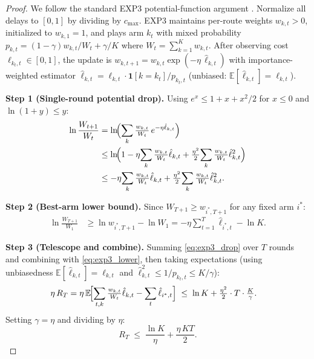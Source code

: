 \documentclass[11pt]{article}
\theoremstyle{definition}
\theoremstyle{remark}
\begin{document}
\begin{proof}
We follow the standard EXP3 potential-function argument
\cite{auer2002nonstochastic}.
Normalize all delays to $[0,1]$ by dividing by $c_{\max}$.
EXP3 maintains per-route weights $w_{k,t} > 0$, initialized to $w_{k,1}=1$,
and plays arm $k_t$ with mixed probability
$p_{k,t} = (1-\gamma)w_{k,t}/W_t + \gamma/K$
where $W_t = \sum_{k=1}^K w_{k,t}$.
After observing cost $\ell_{k_t,t} \in [0,1]$, the update is
$w_{k,t+1} = w_{k,t}\exp(-\eta\,\hat\ell_{k,t})$ with
importance-weighted estimator
$\hat\ell_{k,t} = \ell_{k,t}\cdot\mathbf{1}[k=k_t]/p_{k_t,t}$ (unbiased: $\mathbb{E}[\hat\ell_{k,t}]=\ell_{k,t}$).

\noindent\textbf{Step 1 (Single-round potential drop).}
Using $e^x \leq 1 + x + x^2/2$ for $x \leq 0$ and $\ln(1+y)\leq y$:
\begin{align}
\ln\frac{W_{t+1}}{W_t}
&= \ln\!\Bigl(\sum_k \tfrac{w_{k,t}}{W_t}\,e^{-\eta\hat\ell_{k,t}}\Bigr)
\notag\\
&\leq \ln\!\Bigl(1 - \eta\!\sum_k \tfrac{w_{k,t}}{W_t}\hat\ell_{k,t}
   + \tfrac{\eta^2}{2}\!\sum_k \tfrac{w_{k,t}}{W_t}\hat\ell^2_{k,t}\Bigr)
\notag\\
&\leq -\eta\!\sum_k \tfrac{w_{k,t}}{W_t}\hat\ell_{k,t}
   + \tfrac{\eta^2}{2}\!\sum_k \tfrac{w_{k,t}}{W_t}\hat\ell^2_{k,t}.
\label{eq:exp3_drop}
\end{align}

\noindent\textbf{Step 2 (Best-arm lower bound).}
Since $W_{T+1} \geq w_{i^*,T+1}$ for any fixed arm $i^*$:
\begin{align}
\ln\frac{W_{T+1}}{W_1}
&\geq \ln w_{i^*,T+1} - \ln W_1
= -\eta\!\sum_{t=1}^T \hat\ell_{i^*,t} - \ln K.
\label{eq:exp3_lower}
\end{align}

\noindent\textbf{Step 3 (Telescope and combine).}
Summing \eqref{eq:exp3_drop} over $T$ rounds and combining with
\eqref{eq:exp3_lower}, then taking expectations
(using unbiasedness $\mathbb{E}[\hat\ell_{k,t}]=\ell_{k,t}$
and $\hat\ell^2_{k,t} \leq 1/p_{k_t,t} \leq K/\gamma$):
\begin{align}
\eta\,R_T
&= \eta\,\mathbb{E}\!\Bigl[\sum_{t,k}\tfrac{w_{k,t}}{W_t}\hat\ell_{k,t}
   - \sum_t\hat\ell_{i^*,t}\Bigr]
\;\leq\; \ln K + \tfrac{\eta^2}{2}\cdot T\cdot\tfrac{K}{\gamma}.
\label{eq:exp3_reg}
\end{align}
Setting $\gamma = \eta$ and dividing by $\eta$:
\[
R_T \;\leq\; \frac{\ln K}{\eta} + \frac{\eta\,KT}{2}.
\]


\end{proof}
\end{document}
